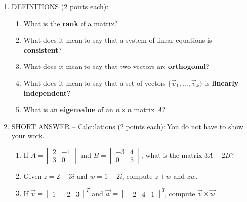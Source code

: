 \documentclass[12pt]{article}
\begin{document}
\begin{enumerate}
\item DEFINITIONS (2 points each):

\begin{enumerate}
 \item What is the {\bf rank} of a matrix? 

\vspace{1.25in}

 \item What does it mean to say that a system of linear equations is {\bf consistent}?

\vspace{1.25in}

 \item What does it mean to say that two vectors are {\bf orthogonal}?

\vspace{1.25in}

 \item What does it mean to say that a set of vectors $\{\vec{v}_1,\ldots, \vec{v}_k\}$ is {\bf linearly independent}?

\vspace{1.25in}

 \item What is an {\bf eigenvalue} of an $n\times n$ matrix $A$?


 
\end{enumerate}
\newpage

\item SHORT ANSWER -- Calculations (2 points each): You do not have to show your work.

\begin{enumerate}
 \item If $A=\begin{bmatrix}2&-1\\3&0\end{bmatrix}$ and $B=\begin{bmatrix}-3&4\\0&5\end{bmatrix}$, what is the matrix $3A-2B$?

\vspace{1.5in}

 \item Given $z=2-3i$ and $w=1+2i$, compute $z+w$ and $zw$.

\vspace{1.75in}

 \item If $\vec{v}=\begin{bmatrix}1&-2&3\end{bmatrix}^T$ and $\vec{w}=\begin{bmatrix}-2&4&1\end{bmatrix}^T$, compute $\vec{v}\times \vec{w}$.


\end{enumerate}
\end{enumerate}
\end{document}
